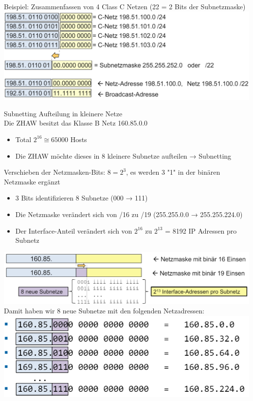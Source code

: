 \begin{example}
    Beispiel: Zusammenfassen von 4 Class C Netzen (22 = 2 Bits der Subnetzmaske)\\
        \includegraphics[width=1\linewidth]{images/example_supernetting.png}
\end{example}

\begin{concept}{Subnetting}
    Aufteilung in kleinere Netze\\
    Die ZHAW besitzt das Klasse B Netz 160.85.0.0
    \begin{itemize}
        \item Total $2^{16} \cong 65000$  Hosts
        \item Die ZHAW möchte dieses in 8 kleinere Subnetze aufteilen → Subnetting
    \end{itemize}
    Verschieben der Netzmasken-Bits: $8 = 2^3$, es werden 3 "1" in der binären Netzmaske ergänzt
    \begin{itemize}
        \item 3 Bits identifizieren 8 Subnetze (000 → 111)
        \item Die Netzmaske verändert sich von /16 zu /19 (255.255.0.0 → 255.255.224.0)
        \item Der Interface-Anteil verändert sich von $2^{16}$ zu $2^{13}$ = 8192 IP Adressen pro Subnetz
    \end{itemize}
        \includegraphics[width=1\linewidth]{images/subnetting1.png}\\
    Damit haben wir 8 neue Subnetze mit den folgenden Netzadressen:\\
        \includegraphics[width=0.75\linewidth]{images/subnetting2.png}

\end{concept}
